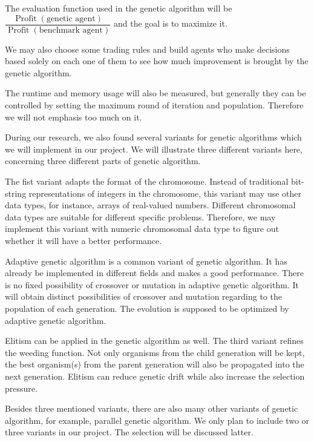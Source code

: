 \documentclass{article}
\begin{document}
The evaluation function used in the genetic algorithm will be
$\dfrac{
		\operatorname{Profit}(\text{genetic agent})
	}{
		\operatorname{Profit}(\text{benchmark agent})
	}$ and the goal is to maximize it.

We may also choose some trading rules and build agents who make decisions based solely
on each one of them to see how much improvement is brought by the genetic algorithm.

The runtime and memory usage will also be measured,
but generally they can be controlled by setting the maximum round of iteration and population.
Therefore we will not emphasis too much on it.



During our research, we also found several variants for genetic algorithms which we will implement in our project.
We will illustrate three different variants here, concerning three different parts of genetic algorithm.

The fist variant adapts the format of the chromosome.
Instead of traditional bit-string representations of integers in the chromosome, this variant may use other data types, for instance, arrays of real-valued numbers.
Different chromosomal data types are suitable for different specific problems.
Therefore, we may implement this variant with numeric chromosomal data type to figure out whether it will have a better performance.

Adaptive genetic algorithm is a common variant of genetic algorithm.
It has already be implemented in different fields and makes a good performance.\cite{an-adaptive-genetic-algorithm-with-dominated-genes} \cite{an-adaptive-genetic-algorithm-for-crystal-structure-prediction}
There is no fixed possibility of crossover or mutation in adaptive genetic algorithm.
It will obtain distinct possibilities of crossover and mutation regarding to the population of each generation.
The evolution is supposed to be optimized by adaptive genetic algorithm.

Elitism can be applied in the genetic algorithm as well.
The third variant refines the weeding function.
Not only organisms from the child generation will be kept, the best organism(s) from the parent generation will also be propagated into the next generation.
Elitism can reduce genetic drift while also increase the selection pressure. \cite{eletism-based-compact-genetic-algorithms}

Besides three mentioned variants, there are also many other variants of genetic algorithm, for example, parallel genetic algorithm. \cite{sizing-populations-for-serial-and-parallel-genetic-algorithms}
We only plan to include two or three variants in our project.
The selection will be discussed latter.
\end{document}
